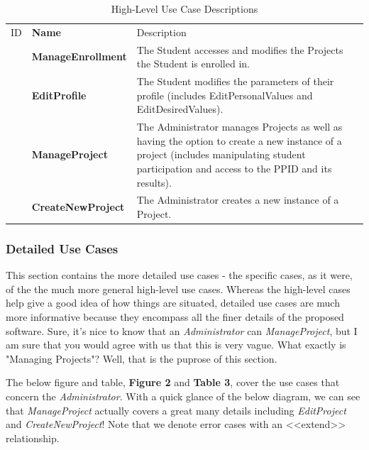 \documentclass[12pt,letterpaper]{article}
\begin{document}
\begin{table}[H]
	\caption{High-Level Use Case Descriptions}
	\begin{tabu} to 
	    \tableheader{}ID & Name & Description\\
	    \manageenrollment{} & ManageEnrollment & The Student accesses and modifies the Projects the Student is enrolled in.\\
		\editprofile{} & EditProfile & The Student modifies the parameters of their profile (includes EditPersonalValues and EditDesiredValues).\\
		\manageproject{} & ManageProject & The Administrator manages Projects as well as having the option to create a new instance of a project (includes manipulating student participation and access to the PPID and its results).\\
		\createnewproject{} & CreateNewProject & The Administrator creates a new instance of a Project.\\
	\end{tabu}
\end{table}

\subsubsection*{Detailed Use Cases}

This section contains the more detailed use cases - the specific cases, as it were, of the the much more general high-level use cases. Whereas the high-level cases help give a good
idea of how things are situated, detailed use cases are much more informative because they encompass all the finer details of the proposed software. Sure, it's nice to know that
an {\it Administrator} can {\it ManageProject}, but I am sure that you would agree with us that this is very vague. What exactly is "Managing Projects"? Well, that is the puprose of this 
section. 

The below figure and table, {\bf Figure 2} and {\bf Table 3}, cover the use cases that concern the {\it Administrator}. With a quick glance of the below diagram, we can see that {\it ManageProject} actually covers a 
great many details including {\it EditProject} and {\it CreateNewProject}! Note that we denote error cases with an <<extend>> relationship.
\end{document}
